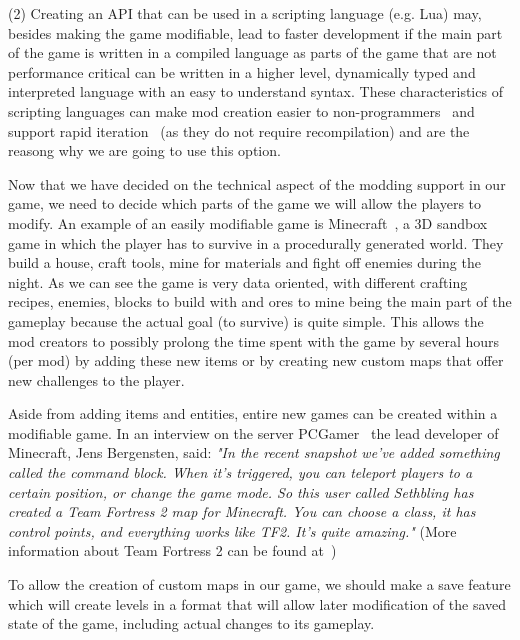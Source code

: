 (2) Creating an API that can be used in a scripting language (e.g. Lua) may, besides making the game modifiable, lead to faster
development if the main part of the game is written in a compiled language as parts of the game that are not performance critical
can be written in a higher level, dynamically typed and interpreted language with an easy to understand syntax. 
These characteristics of scripting languages can make mod creation easier to non-programmers~\cite{WhyScripting} and support
rapid iteration~\cite{GEA} (as they do not require recompilation) and are the reasong why we are going to use this option.

Now that we have decided on the technical aspect of the modding support in our game, we need to decide which parts of the game
we will allow the players to modify. An example of an easily modifiable game is Minecraft~\cite{Minecraft}, a 3D sandbox game 
in which the player has to survive in a procedurally generated world. They build a house, craft tools, mine for materials and
fight off enemies during the night. As we can see the game is very data oriented, with different crafting recipes, enemies, blocks
to build with and ores to mine being the main part of the gameplay because the actual goal (to survive) is quite simple. This allows
the mod creators to possibly prolong the time spent with the game by several hours (per mod) by adding these new items or by
creating new custom maps that offer new challenges to the player.

Aside from adding items and entities, entire new games can be created within a modifiable game. 
In an interview on the server PCGamer~\cite{FutureOfMinecraft}
the lead developer of Minecraft, Jens Bergensten, said:
\emph{"In the recent snapshot we've added something called the command block. When it's triggered, 
you can teleport players to a certain position, or change the game mode.
So this user called Sethbling has created a Team Fortress 2 map for Minecraft. 
You can choose a class, it has control points, and everything works like TF2. It's quite amazing."}
(More information about Team Fortress 2 can be found at~\cite{TF2})

To allow the creation of custom maps in our game, we should make a save feature which will create levels
in a format that will allow later modification of the saved state of the game, including actual changes to its gameplay.


